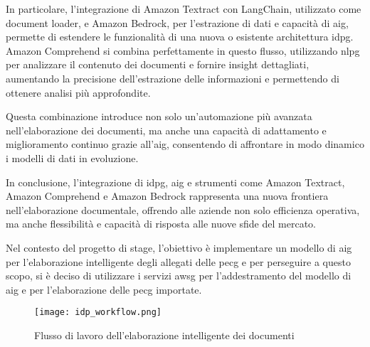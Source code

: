 In particolare, l'integrazione di Amazon Textract con LangChain, utilizzato come document loader, e Amazon Bedrock, per l'estrazione di dati e capacità di \gls{aig}, permette di estendere le funzionalità di una nuova o esistente architettura \gls{idpg}. Amazon Comprehend si combina perfettamente in questo flusso, utilizzando \gls{nlpg} per analizzare il contenuto dei documenti e fornire insight dettagliati, aumentando la precisione dell'estrazione delle informazioni e permettendo di ottenere analisi più approfondite.

Questa combinazione introduce non solo un'automazione più avanzata nell'elaborazione dei documenti, ma anche una capacità di adattamento e miglioramento continuo grazie all'\gls{aig}, consentendo di affrontare in modo dinamico i modelli di dati in evoluzione.

In conclusione, l'integrazione di \gls{idpg}, \gls{aig} e strumenti come Amazon Textract, Amazon Comprehend e Amazon Bedrock rappresenta una nuova frontiera nell'elaborazione documentale, offrendo alle aziende non solo efficienza operativa, ma anche flessibilità e capacità di risposta alle nuove sfide del mercato.

Nel contesto del progetto di stage, l'obiettivo è implementare un modello di \gls{aig} per l'elaborazione intelligente degli allegati delle \gls{pecg} e per perseguire a questo scopo, si è deciso di utilizzare i servizi \gls{awsg} per l'addestramento del modello di \gls{aig} e per l'elaborazione delle \gls{pecg} importate. 

\begin{figure}[!ht]
    \centering
    \texttt{[image: idp\_workflow.png]}
    \caption{Flusso di lavoro dell'elaborazione intelligente dei documenti}
    \label{fig:idp_workflow}
\end{figure}




%
%
%
